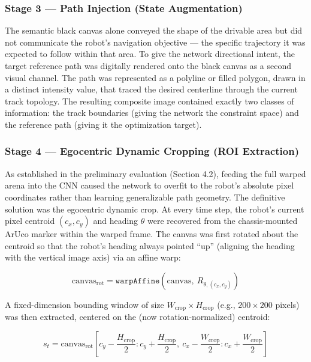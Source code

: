 \subsubsection{Stage 3 — Path Injection (State Augmentation)}

The semantic black canvas alone conveyed the shape of the drivable area but did not
communicate the robot's navigation objective — the specific trajectory it was expected to follow
within that area. To give the network directional intent, the target reference path was digitally
rendered onto the black canvas as a second visual channel. The path was represented as a
polyline or filled polygon, drawn in a distinct intensity value, that traced the desired centerline
through the current track topology. The resulting composite image contained exactly two classes
of information: the track boundaries (giving the network the constraint space) and the reference
path (giving it the optimization target).

\subsubsection{Stage 4 — Egocentric Dynamic Cropping (ROI Extraction)}

As established in the preliminary evaluation (Section 4.2), feeding the full 
warped arena into the CNN caused the network to overfit to the robot's absolute 
pixel coordinates rather than learning generalizable path geometry. The definitive 
solution was the egocentric dynamic crop. At every time step, the robot's current
pixel centroid $(c_x, c_y)$ and heading $\theta$ were recovered from the chassis-mounted
ArUco marker within the warped frame. The canvas was first rotated about the centroid so
that the robot's heading always pointed ``up'' (aligning the heading with the vertical
image axis) via an affine warp:

\begin{equation}
    \text{canvas}_{\text{rot}} = \texttt{warpAffine}\!\left(\text{canvas},\
    R_{\theta,(c_x, c_y)}\right)
    \label{eq:egorot}
\end{equation}

A fixed-dimension bounding window of size $W_{\text{crop}} \times H_{\text{crop}}$
(e.g., $200 \times 200$ pixels) was then extracted, centered on the
(now rotation-normalized) centroid:

\begin{equation}
    s_t = \text{canvas}_{\text{rot}}\left[c_y - \frac{H_{\text{crop}}}{2} : c_y +
    \frac{H_{\text{crop}}}{2},\ c_x - \frac{W_{\text{crop}}}{2} : c_x +
    \frac{W_{\text{crop}}}{2}\right]
    \label{eq:egocrop}
\end{equation}

